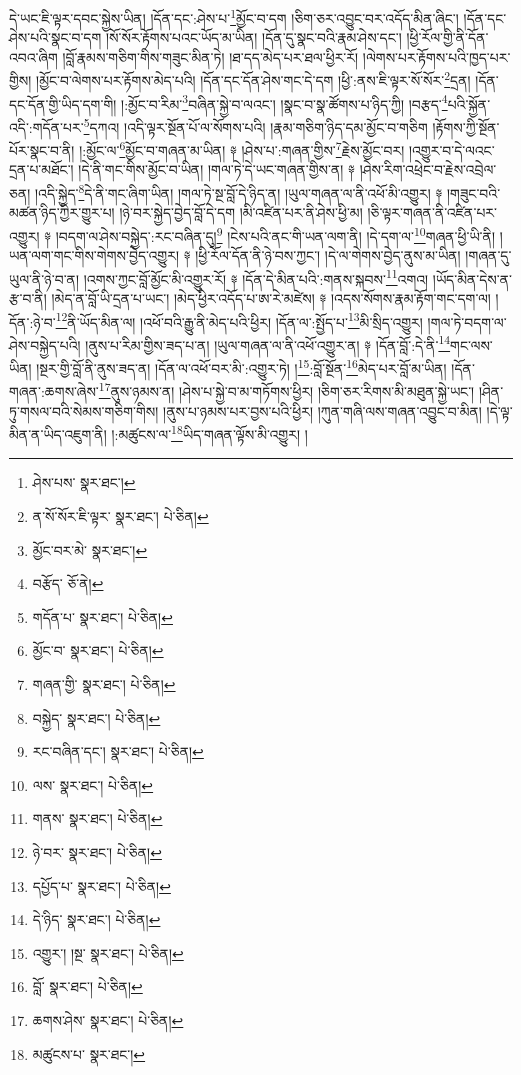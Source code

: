 དེ་ཡང་ཇི་ལྟར་དབང་སྐྱེས་ཡིན། །དོན་དང་:ཤེས་པ་\footnote{ཤེས་པས་  སྣར་ཐང་། }མྱོང་བ་དག །ཅིག་ཅར་འབྱུང་བར་འདོད་མིན་ཞིང་། །དོན་དང་ཤེས་པའི་སྣང་བ་དག །སོ་སོར་རྟོགས་པའང་ཡོད་མ་ཡིན། །དོན་དུ་སྣང་བའི་རྣམ་ཤེས་དང་། །ཕྱི་རོལ་གྱི་ནི་དོན་འབའ་ཞིག །བློ་རྣམས་གཅིག་གིས་གཟུང་མིན་ཏེ། །ཐ་དད་མེད་པར་ཐལ་ཕྱིར་རོ། །ལེགས་པར་རྟོགས་པའི་ཁྱད་པར་གྱིས། །མྱོང་བ་ལེགས་པར་རྟོགས་མེད་པའི། །དོན་དང་དོན་ཤེས་གང་དེ་དག །ཕྱི་:ནས་ཇི་ལྟར་སོ་སོར་\footnote{ན་སོ་སོར་ཇི་ལྟར་  སྣར་ཐང་།  པེ་ཅིན། }དྲན། །དོན་དང་དོན་གྱི་ཡིད་དག་གི། །:མྱོང་བ་རིམ་\footnote{མྱོང་བར་མེ་  སྣར་ཐང་། }བཞིན་སྐྱེ་བ་ལའང་། །སྣང་བ་སྣ་ཚོགས་པ་ཉིད་ཀྱི། །བརྩད་\footnote{བརྩོད་  ཅོ་ནེ། }པའི་སྐྱོན་འདི་:གདོན་པར་\footnote{གདོན་པ་  སྣར་ཐང་།  པེ་ཅིན། }དཀའ། །འདི་ལྟར་སྔོན་པོ་ལ་སོགས་པའི། །རྣམ་གཅིག་ཉིད་དམ་མྱོང་བ་གཅིག །རྟོགས་ཀྱི་སྔོན་པོར་སྣང་བ་ནི། །:མྱོང་ལ་\footnote{མྱོང་བ་  སྣར་ཐང་།  པེ་ཅིན། }མྱོང་བ་གཞན་མ་ཡིན། ༈ །ཤེས་པ་:གཞན་གྱིས་\footnote{གཞན་གྱི་  སྣར་ཐང་།  པེ་ཅིན། }རྗེས་མྱོང་བར། །འགྱུར་བ་དེ་ལའང་དྲན་པ་མཐོང་། །དེ་ནི་གང་གིས་མྱོང་བ་ཡིན། །གལ་ཏེ་དེ་ཡང་གཞན་གྱིས་ན། ༈ །ཤེས་རིག་འཕྲེང་བ་རྗེས་འབྲེལ་ཅན། །འདི་སྐྱེད་\footnote{བསྐྱེད་  སྣར་ཐང་།  པེ་ཅིན། }དེ་ནི་གང་ཞིག་ཡིན། །གལ་ཏེ་སྔ་བློ་དེ་ཉིད་ན། །ཡུལ་གཞན་ལ་ནི་འཕོ་མི་འགྱུར། ༈ །གཟུང་བའི་མཚན་ཉིད་ཀྱིར་གྱུར་པ། །ཉེ་བར་སྐྱེད་བྱེད་བློ་དེ་དག །མི་འཛིན་པར་ནི་ཤེས་ཕྱི་མ། །ཅི་ལྟར་གཞན་ནི་འཛིན་པར་འགྱུར། ༈ །བདག་ལ་ཤེས་བསྐྱེད་:རང་བཞིན་དུ།\footnote{རང་བཞིན་དང་།  སྣར་ཐང་།  པེ་ཅིན། } །ངེས་པའི་ནང་གི་ཡན་ལག་ནི། །དེ་དག་ལ་\footnote{ལས་  སྣར་ཐང་།  པེ་ཅིན། }གཞན་ཕྱི་ཡི་ནི། །ཡན་ལག་གང་གིས་གེགས་བྱེད་འགྱུར། ༈ །ཕྱི་རོལ་དོན་ནི་ཉེ་བས་ཀྱང་། །དེ་ལ་གེགས་བྱེད་ནུས་མ་ཡིན། །གཞན་དུ་ཡུལ་ནི་ཉེ་བ་ན། །འགས་ཀྱང་བློ་མྱོང་མི་འགྱུར་རོ། ༈ །དོན་དེ་མིན་པའི་:གནས་སྐབས་\footnote{གནས་  སྣར་ཐང་།  པེ་ཅིན། }འགའ། །ཡོད་མིན་དེས་ན་རྩ་བ་ནི། །མེད་ན་བློ་ཡི་དྲན་པ་ཡང་། །མེད་ཕྱིར་འདོད་པ་ཨ་རེ་མཛེས། ༈ །འདས་སོགས་རྣམ་རྟོག་གང་དག་ལ། །དོན་:ཉེ་བ་\footnote{ཉེ་བར་  སྣར་ཐང་།  པེ་ཅིན། }ནི་ཡོད་མིན་ལ། །འཕོ་བའི་རྒྱུ་ནི་མེད་པའི་ཕྱིར། །དོན་ལ་:སྤྱོད་པ་\footnote{དཔྱོད་པ་  སྣར་ཐང་།  པེ་ཅིན། }མི་སྲིད་འགྱུར། །གལ་ཏེ་བདག་ལ་ཤེས་བསྐྱེད་པའི། །ནུས་པ་རིམ་གྱིས་ཟད་པ་ན། །ཡུལ་གཞན་ལ་ནི་འཕོ་འགྱུར་ན། ༈ །དོན་བློ་:དེ་ནི་\footnote{དེ་ཉིད་  སྣར་ཐང་།  པེ་ཅིན། }གང་ལས་ཡིན། །སྔར་གྱི་བློ་ནི་ནུས་ཟད་ན། །དོན་ལ་འཕོ་བར་མི་:འགྱུར་ཏེ། །\footnote{འགྱུར་། །སྔ་  སྣར་ཐང་།  པེ་ཅིན། }:བློ་སྔོན་\footnote{བློ་  སྣར་ཐང་།  པེ་ཅིན། }མེད་པར་བློ་མ་ཡིན། །དོན་གཞན་:ཆགས་ཞེས་\footnote{ཆགས་ཤེས་  སྣར་ཐང་།  པེ་ཅིན། }ནུས་ཉམས་ན། །ཤེས་པ་སྐྱེ་བ་མ་གཏོགས་ཕྱིར། །ཅིག་ཅར་རིགས་མི་མཐུན་སྐྱེ་ཡང་། །ཤིན་ཏུ་གསལ་བའི་སེམས་གཅིག་གིས། །ནུས་པ་ཉམས་པར་བྱས་པའི་ཕྱིར། །ཀུན་གཞི་ལས་གཞན་འབྱུང་བ་མིན། །དེ་ལྟ་མིན་ན་ཡིད་འཇུག་ནི། །:མཚུངས་ལ་\footnote{མཚུངས་པ་  སྣར་ཐང་། }ཡིད་གཞན་ལྟོས་མི་འགྱུར། །
